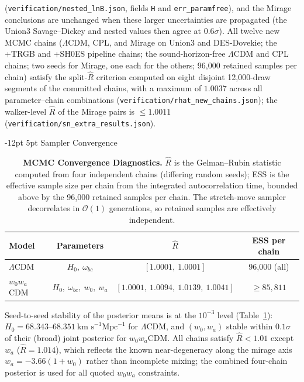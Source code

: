 \documentclass[11pt,letterpaper]{article}
\makeatletter
\renewcommand{\subsection}{\@startsection{subsection}{2}{\z@}%
  {-12pt \@plus -3pt \@minus -1pt}%
  {5pt \@plus 1pt}%
  {\normalfont\large\bfseries\color{tealaccent}}}
\makeatother
\begin{document}
(\texttt{verification/nested\_lnB.json}, fields \texttt{H} and \texttt{err\_paramfree}), and the Mirage conclusions are unchanged when these larger uncertainties are propagated (the Union3 Savage--Dickey and nested values then agree at $0.6\sigma$). All twelve new MCMC chains ($\Lambda$CDM, CPL, and Mirage on Union3 and DES-Dovekie; the +TRGB and +SH0ES pipeline chains; the sound-horizon-free $\Lambda$CDM and CPL chains; two seeds for Mirage, one each for the others; 96{,}000 retained samples per chain) satisfy the split-$\widehat{R}$ criterion computed on eight disjoint 12{,}000-draw segments of the committed chains, with a maximum of $1.0037$ across all parameter--chain combinations (\texttt{verification/rhat\_new\_chains.json}); the walker-level $\widehat{R}$ of the Mirage pairs is $\le 1.0011$ (\texttt{verification/sn\_extra\_results.json}).

\subsection{Sampler Convergence}

\begin{table}[!htbp]
    \centering
    \caption{\textbf{MCMC Convergence Diagnostics.} $\widehat{R}$ is the Gelman--Rubin statistic computed from four independent chains (differing random seeds); ESS is the effective sample size per chain from the integrated autocorrelation time, bounded above by the 96{,}000 retained samples per chain. The stretch-move sampler decorrelates in $\mathcal{O}(1)$ generations, so retained samples are effectively independent.}
    \label{tab:convergence}
    \begin{tabular}{lccc}
        \toprule
        Model & Parameters & $\widehat{R}$ & ESS per chain \\
        \midrule
        $\Lambda$CDM & $H_0,\ \omega_{bc}$ & $[1.0001,\ 1.0001]$ & 96{,}000 (all) \\
        $w_0 w_a$CDM & $H_0,\ \omega_{bc},\ w_0,\ w_a$ & $[1.0001,\ 1.0094,\ 1.0139,\ 1.0041]$ & $\ge 85{,}811$ \\
        \bottomrule
    \end{tabular}
\end{table}

Seed-to-seed stability of the posterior means is at the $10^{-3}$ level (Table~\ref{tab:convergence}): $H_0 = 68.343$--$68.351~\text{km~s}^{-1}\text{Mpc}^{-1}$ for $\Lambda$CDM, and $(w_0, w_a)$ stable within $0.1\sigma$ of their (broad) joint posterior for $w_0 w_a$CDM. All chains satisfy $\widehat{R} < 1.01$ except $w_a$ ($\widehat{R} = 1.014$), which reflects the known near-degeneracy along the mirage axis $w_a = -3.66(1+w_0)$ rather than incomplete mixing; the combined four-chain posterior is used for all quoted $w_0 w_a$ constraints.
\end{document}
